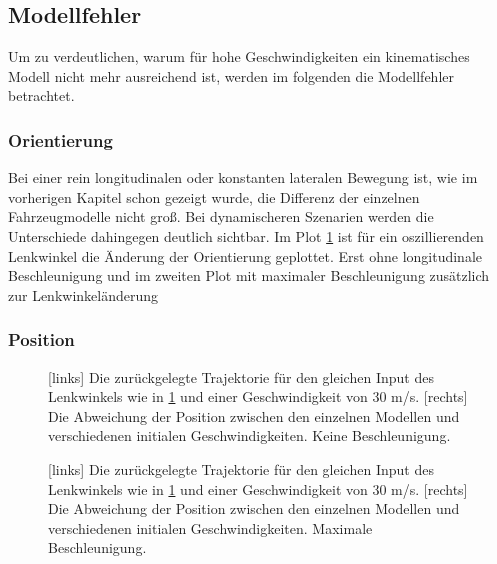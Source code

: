 \documentclass{like}
\begin{document}
\subsection{Modellfehler}
Um zu verdeutlichen, warum für hohe Geschwindigkeiten ein kinematisches Modell nicht mehr ausreichend ist, werden im folgenden die Modellfehler betrachtet. 

\subsubsection*{Orientierung}
Bei einer rein longitudinalen oder konstanten lateralen Bewegung ist, wie im vorherigen Kapitel schon gezeigt wurde, die Differenz der einzelnen Fahrzeugmodelle nicht groß. Bei dynamischeren Szenarien werden die Unterschiede dahingegen deutlich sichtbar. Im Plot \ref{fig:modelDiffOrient} ist für ein oszillierenden Lenkwinkel die Änderung der Orientierung geplottet. Erst ohne longitudinale Beschleunigung und im zweiten Plot mit maximaler Beschleunigung zusätzlich zur Lenkwinkeländerung 

\begin{figure}
	\centering
	 
	\caption{}
	\label{fig:modelDiffOrient}
\end{figure}

\begin{figure}
	\centering
	 
	\caption{}
	\label{fig:modelDiffOrientMaxAcc}
\end{figure}


\subsubsection*{Position}


\begin{figure}
	\centering
	 
	\caption{[links] Die zurückgelegte Trajektorie für den gleichen Input des Lenkwinkels wie in \ref{fig:modelDiffOrient} und einer Geschwindigkeit von 30 m/s. [rechts] Die Abweichung der Position zwischen den einzelnen Modellen und verschiedenen initialen Geschwindigkeiten. Keine Beschleunigung.}
	\label{fig:modelDiffPos}
\end{figure}


\begin{figure}
	\centering
	 
	\caption{[links] Die zurückgelegte Trajektorie für den gleichen Input des Lenkwinkels wie in \ref{fig:modelDiffOrient} und einer Geschwindigkeit von 30 m/s. [rechts] Die Abweichung der Position zwischen den einzelnen Modellen und verschiedenen initialen Geschwindigkeiten. Maximale Beschleunigung.}
	\label{fig:modelDiffPosMaxAcc}
\end{figure}
\end{document}
